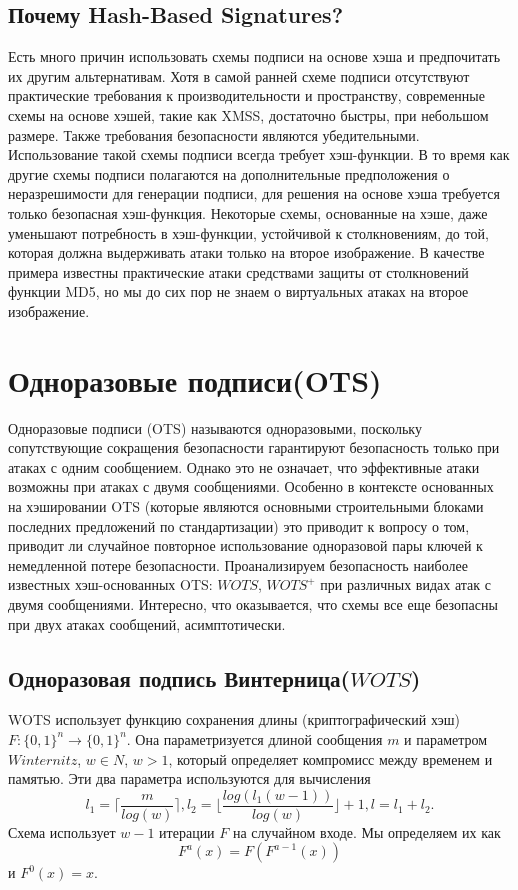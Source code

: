 \documentclass[a4paper, 14pt]{extarticle}
\begin{document}
\subsection{Почему Hash-Based Signatures?}
Есть много причин использовать схемы подписи на основе хэша и предпочитать их другим альтернативам. Хотя в самой ранней схеме подписи отсутствуют практические требования к производительности и пространству, современные схемы на основе хэшей, такие как XMSS, достаточно быстры, при небольшом размере. Также требования безопасности являются убедительными. Использование такой схемы подписи всегда требует хэш-функции. В то время как другие схемы подписи полагаются на дополнительные предположения о неразрешимости для генерации подписи, для решения на основе хэша требуется только безопасная хэш-функция. Некоторые схемы, основанные на хэше, даже уменьшают потребность в хэш-функции, устойчивой к столкновениям, до той, которая должна выдерживать атаки только на второе изображение. В качестве примера известны практические атаки средствами защиты от столкновений функции MD5, но мы до сих пор не знаем о виртуальных атаках на второе изображение.
\newpage

\section{Одноразовые подписи(OTS)}
Одноразовые подписи (OTS) называются одноразовыми, поскольку сопутствующие сокращения безопасности гарантируют безопасность только при атаках с одним сообщением. Однако это не означает, что эффективные атаки возможны при атаках с двумя сообщениями. Особенно в контексте основанных на хэшировании OTS (которые являются основными строительными блоками последних предложений по стандартизации) это приводит к вопросу о том, приводит ли случайное повторное использование одноразовой пары ключей к немедленной потере безопасности. Проанализируем безопасность наиболее известных хэш-основанных OTS: $WOTS$, $WOTS^{+}$ при различных видах атак с двумя сообщениями. Интересно, что оказывается, что схемы все еще безопасны при двух атаках сообщений, асимптотически.
\subsection{Одноразовая подпись Винтерница($WOTS$)}
WOTS использует функцию сохранения длины (криптографический хэш) $F : \{0, 1\}^{n} \rightarrow \{0, 1\}^{n}$. Она параметризуется длиной сообщения $m$ и параметром $Winternitz$, $w \in N$, $w > 1$, который определяет компромисс между временем и памятью. Эти два параметра используются для вычисления
\[ l_{1} = \Bigg \lceil \frac{m}{log(w)} \Bigg \rceil, l_{2} = \Bigg \lfloor \frac{log(l_{1}(w - 1))}{log(w)} \Bigg \rfloor + 1, l = l_{1} + l_{2}. \]
Схема использует $w - 1$ итерации $F$ на случайном входе. Мы определяем их как
\[ F^{a}(x) = F(F^{a - 1}(x)) \]
и $F^{0}(x) = x$.
\end{document}
